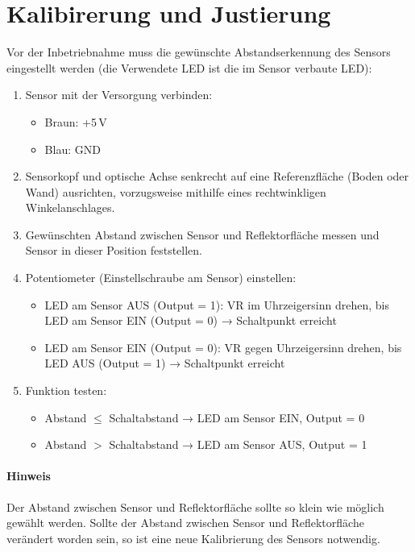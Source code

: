 \section{Kalibirerung und Justierung}


Vor der Inbetriebnahme muss die gewünschte Abstandserkennung des Sensors eingestellt werden (die Verwendete LED ist die im Sensor verbaute LED):

\begin{enumerate}
	\item Sensor mit der Versorgung verbinden:
	\begin{itemize}
		\item Braun: +5\,V
		\item Blau: GND
	\end{itemize}
	
	\item Sensorkopf und optische Achse  senkrecht auf eine Referenzfläche (Boden oder Wand) ausrichten, vorzugsweise mithilfe eines rechtwinkligen Winkelanschlages.
	\item Gewünschten Abstand zwischen Sensor und Reflektorfläche messen und Sensor in dieser Position feststellen. 
	\item Potentiometer (Einstellschraube am Sensor) einstellen:
	\begin{itemize}
		\item LED am Sensor AUS (Output = 1): VR im Uhrzeigersinn drehen, bis LED am Sensor EIN (Output = 0) → Schaltpunkt erreicht
		\item LED am Sensor EIN (Output = 0): VR gegen Uhrzeigersinn drehen, bis LED AUS (Output = 1) → Schaltpunkt erreicht
	\end{itemize}

	\item Funktion testen:
	\begin{itemize}
		\item Abstand $\leq$ Schaltabstand → LED  am Sensor EIN, Output = 0
		\item Abstand $>$ Schaltabstand → LED am Sensor AUS, Output = 1
	\end{itemize}
\end{enumerate}

\paragraph{Hinweis}
Der Abstand zwischen Sensor und Reflektorfläche sollte so klein wie möglich gewählt werden. 
Sollte der Abstand zwischen Sensor und Reflektorfläche verändert worden sein, so ist eine neue Kalibrierung des Sensors notwendig.

